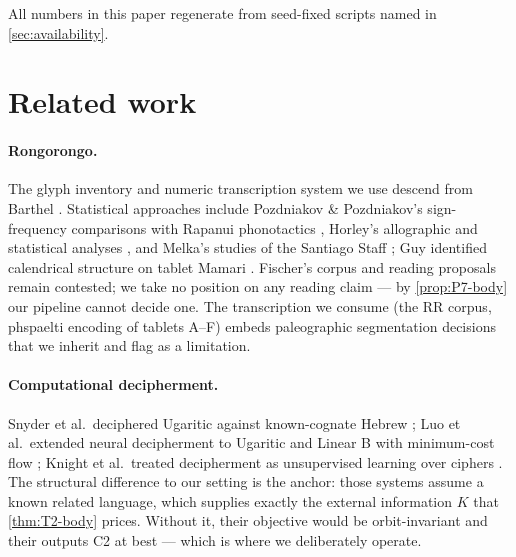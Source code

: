 \documentclass[10pt,twocolumn]{article}
\newcommand{\Ctwo}{\textsf{C2}}
\begin{document}
All numbers in this paper regenerate from seed-fixed scripts named in
\cref{sec:availability}.

\section{Related work}
\label{sec:related}

\paragraph{Rongorongo.} The glyph inventory and numeric transcription
system we use descend from Barthel \cite{barthel1958}. Statistical
approaches include Pozdniakov \& Pozdniakov's sign-frequency comparisons
with Rapanui phonotactics \cite{pozdniakov2007}, Horley's allographic
and statistical analyses \cite{horley2005}, and Melka's studies of the
Santiago Staff \cite{melka2009}; Guy identified calendrical structure on
tablet Mamari \cite{guy1990}. Fischer's corpus and reading proposals
\cite{fischer1997} remain contested; we take no position on any reading
claim --- by \cref{prop:P7-body} our pipeline cannot decide one. The
transcription we consume (the RR corpus, phspaelti encoding of tablets
A--F) embeds paleographic segmentation decisions that we inherit and
flag as a limitation.

\paragraph{Computational decipherment.} Snyder et al.\ deciphered
Ugaritic against known-cognate Hebrew \cite{snyder2010}; Luo et al.\
extended neural decipherment to Ugaritic and Linear B with minimum-cost
flow \cite{luo2019}; Knight et al.\ treated decipherment as unsupervised
learning over ciphers \cite{knight2006}. The structural difference to
our setting is the anchor: those systems assume a known related
language, which supplies exactly the external information $K$ that
\cref{thm:T2-body} prices. Without it, their objective would be
orbit-invariant and their outputs \Ctwo{} at best --- which is where we
deliberately operate.
\end{document}
